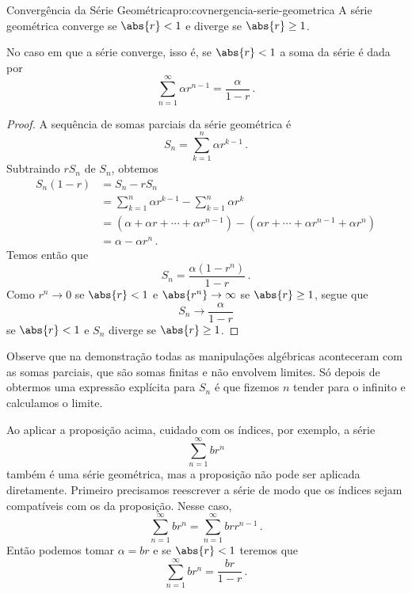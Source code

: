 \begin{proposicao}{Convergência da Série Geométrica}{pro:covnergencia-serie-geometrica}
  A série geométrica converge se $\abs{r}<1$ e diverge se  $\abs{r}\geq 1$.

  No caso em que a série converge, isso é, se $\abs{r}<1$ a soma da série é dada por
  \begin{equation}
    \label{eq:soma-serie-geometrica}
    \sum_{n=1}^\infty \alpha r^{n-1} = \frac{\alpha}{1-r}  \,.
  \end{equation}
\end{proposicao}
\begin{proof}
  A sequência de somas parciais da série geométrica é
  \[
    S_n = \sum_{k=1}^n \alpha r^{k-1}  \,.
  \]
  Subtraindo $rS_n$ de $S_n$, obtemos
  \begin{align*}
    S_n(1-r) & = S_n-rS_n                                  \\
             & = \sum_{k=1}^n \alpha r^{k-1}-\sum_{k=1}^n \alpha r^{k}  \\
             & = \left( \alpha
                      + \alpha r
                      + \cdots
                      + \alpha r^{n-1}
                 \right) -
                 \left( \alpha r
                      + \cdots
                      + \alpha r^{n-1}
                      + \alpha r^{n}
                 \right) \\
             & = \alpha - \alpha r^n   \,.
  \end{align*}
  Temos então que
  \[
    S_n = \frac{\alpha \left(1-r^n\right)}{1-r}   \,.
  \]
  Como $r^n\to 0$ se $\abs{r}<1$ e $\abs{r^n}\to\infty$ se $\abs{r}\geq 1$,
  segue que
  \[
    S_n\to \frac{\alpha}{1-r}
  \]
  se $\abs{r}<1$ e $S_n$ diverge se $\abs{r}\geq 1$.
\end{proof}

Observe que na demonstração todas as manipulações algébricas aconteceram com as
somas parciais, que são somas finitas e não envolvem limites. Só depois de
obtermos uma expressão explícita para $S_n$ é que fizemos $n$ tender para o
infinito e calculamos o limite.

Ao aplicar a proposição acima, cuidado com os índices, por exemplo, a série
\[
  \sum_{n=1}^\infty br^n
\]
também é uma série geométrica, mas a proposição não pode ser aplicada diretamente.
Primeiro precisamos reescrever a série de modo que os índices sejam compatíveis com os da proposição.
Nesse caso,
\[
  \sum_{n=1}^\infty br^n=\sum_{n=1}^\infty brr^{n-1}   \,.
\]
Então podemos tomar $\alpha = br$ e se $\abs{r}<1$ teremos que
\[
  \sum_{n=1}^\infty br^n = \frac{br}{1-r}   \,.
\]

